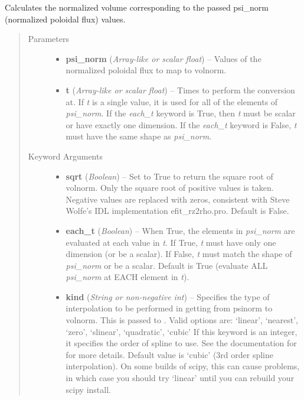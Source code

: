 \documentclass[letterpaper,10pt,english]{sphinxmanual}
\begin{document}
\begin{fulllineitems}
\begin{fulllineitems}
\end{fulllineitems}


\begin{fulllineitems}
\label{eqtools:eqtools.core.Equilibrium.psinorm2volnorm}
Calculates the normalized volume corresponding to the passed psi\_norm (normalized poloidal flux) values.
\begin{quote}\begin{description}
\item[{Parameters}] \leavevmode\begin{itemize}
\item {} 
\textbf{psi\_norm} (\emph{Array-like or scalar float}) --
Values of the normalized
poloidal flux to map to volnorm.

\item {} 
\textbf{t} (\emph{Array-like or scalar float}) --
Times to perform the conversion at.
If \emph{t} is a single value, it is used for all of the elements of
\emph{psi\_norm}. If the \emph{each\_t} keyword is True, then \emph{t} must be scalar
or have exactly one dimension. If the \emph{each\_t} keyword is False,
\emph{t} must have the same shape as \emph{psi\_norm}.

\end{itemize}

\item[{Keyword Arguments}] \leavevmode\begin{itemize}
\item {} 
\textbf{sqrt} (\emph{Boolean}) --
Set to True to return the square root of volnorm. Only
the square root of positive values is taken. Negative values are
replaced with zeros, consistent with Steve Wolfe's IDL
implementation efit\_rz2rho.pro. Default is False.

\item {} 
\textbf{each\_t} (\emph{Boolean}) --
When True, the elements in \emph{psi\_norm} are evaluated at
each value in \emph{t}. If True, \emph{t} must have only one dimension (or
be a scalar). If False, \emph{t} must match the shape of \emph{psi\_norm} or be
a scalar. Default is True (evaluate ALL \emph{psi\_norm} at EACH element in
\emph{t}).

\item {} 
\textbf{kind} (\emph{String or non-negative int}) --
Specifies the type of
interpolation to be performed in getting from psinorm to
volnorm. This is passed to
. Valid options are:
`linear', `nearest', `zero', `slinear', `quadratic', `cubic'
If this keyword is an integer, it specifies the order of spline
to use. See the documentation for  for more
details. Default value is `cubic' (3rd order spline
interpolation). On some builds of scipy, this can cause problems,
in which case you should try `linear' until you can rebuild your
scipy install.


\end{itemize}
\end{description}
\end{quote}
\end{fulllineitems}
\end{fulllineitems}
\end{document}
